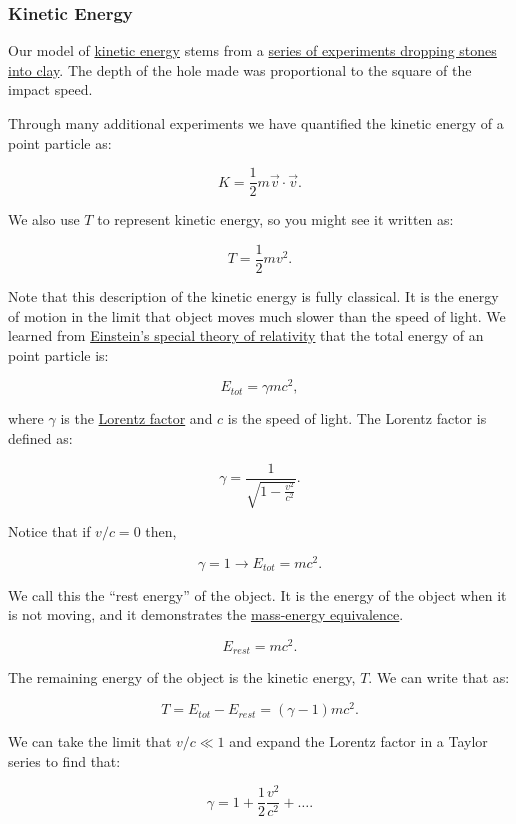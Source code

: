 \documentclass[11pt]{article}
\begin{document}
    \subsubsection{Kinetic Energy}\label{kinetic-energy}

Our model of \href{https://en.wikipedia.org/wiki/Kinetic_energy}{kinetic
energy} stems from a
\href{https://en.wikipedia.org/wiki/Willem_\%27s_Gravesande}{series of
experiments dropping stones into clay}. The depth of the hole made was
proportional to the square of the impact speed.

Through many additional experiments we have quantified the kinetic
energy of a point particle as:

\[K = \frac{1}{2}m\vec{v}\cdot\vec{v}.\]

We also use \(T\) to represent kinetic energy, so you might see it
written as:

\[T = \frac{1}{2}mv^2.\]

Note that this description of the kinetic energy is fully classical. It
is the energy of motion in the limit that object moves much slower than
the speed of light. We learned from
\href{https://en.wikipedia.org/wiki/Special_theory_of_relativity}{Einstein's
special theory of relativity} that the total energy of an point particle
is:

\[E_{tot} = \gamma mc^2,\]

where \(\gamma\) is the
\href{https://en.wikipedia.org/wiki/Lorentz_factor}{Lorentz factor} and
\(c\) is the speed of light. The Lorentz factor is defined as:

\[\gamma = \frac{1}{\sqrt{1 - \frac{v^2}{c^2}}}.\]

Notice that if \(v/c =0\) then,

\[\gamma = 1 \longrightarrow E_{tot} = mc^2.\]

We call this the ``rest energy'' of the object. It is the energy of the
object when it is not moving, and it demonstrates the
\href{https://en.wikipedia.org/wiki/Mass\%E2\%80\%93energy_equivalence}{mass-energy
equivalence}.

\[E_{rest} = mc^2.\]

The remaining energy of the object is the kinetic energy, \(T\). We can
write that as:

\[T = E_{tot} - E_{rest} = (\gamma - 1)mc^2.\]

We can take the limit that \(v/c \ll 1\) and expand the Lorentz factor
in a Taylor series to find that:

\[\gamma = 1 + \frac{1}{2}\frac{v^2}{c^2} + \ldots.\]
\end{document}
